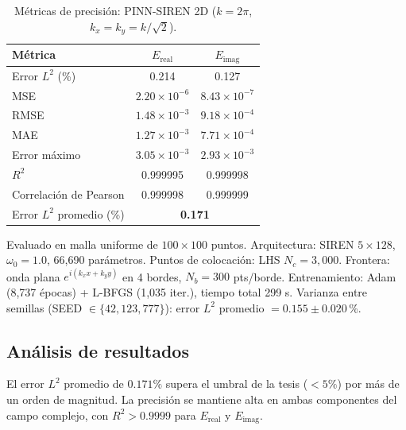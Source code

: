 \begin{table}[htbp]
\centering
\begin{threeparttable}
\caption{Métricas de precisión: PINN-SIREN 2D ($k = 2\pi$, $k_x = k_y = k/\sqrt{2}$).}
\label{tab:resultados2d}
\begin{tabular}{lcc}
\toprule
Métrica & $E_\text{real}$ & $E_\text{imag}$ \\
\midrule
Error $L^2$ (\%)         & 0.214              & 0.127              \\
MSE                      & $2.20 \times 10^{-6}$ & $8.43 \times 10^{-7}$ \\
RMSE                     & $1.48 \times 10^{-3}$ & $9.18 \times 10^{-4}$ \\
MAE                      & $1.27 \times 10^{-3}$ & $7.71 \times 10^{-4}$ \\
Error máximo             & $3.05 \times 10^{-3}$ & $2.93 \times 10^{-3}$ \\
$R^2$                    & 0.999995           & 0.999998           \\
Correlación de Pearson   & 0.999998           & 0.999999           \\
\midrule
Error $L^2$ promedio (\%)& \multicolumn{2}{c}{\textbf{0.171}} \\
\bottomrule
\end{tabular}
\begin{tablenotes}\small
    \item Evaluado en malla uniforme de $100 \times 100$ puntos.
    Arquitectura: SIREN $5 \times 128$, $\omega_0 = 1.0$, 66{,}690 parámetros.
    Puntos de colocación: LHS $N_c = 3{,}000$.
    Frontera: onda plana $e^{i(k_x x + k_y y)}$ en 4 bordes, $N_b = 300$ pts/borde.
    Entrenamiento: Adam (8{,}737 épocas) + L-BFGS (1{,}035 iter.), tiempo total 299 s.
    Varianza entre semillas (SEED $\in \{42, 123, 777\}$):
    error $L^2$ promedio $= 0.155 \pm 0.020$\,\%.
\end{tablenotes}
\end{threeparttable}
\end{table}

\subsection{Análisis de resultados}

El error $L^2$ promedio de $0.171\%$ supera el umbral de la tesis ($< 5\%$) por
más de un orden de magnitud. La precisión se mantiene alta en ambas
componentes del campo complejo, con $R^2 > 0.9999$ para $E_\text{real}$ y
$E_\text{imag}$.

